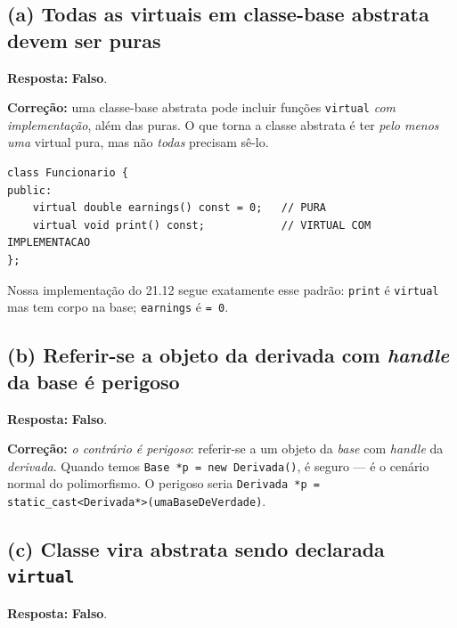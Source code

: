\documentclass[11pt,a4paper]{article}
\begin{document}
\subsection*{(a) Todas as virtuais em classe-base abstrata devem ser puras}

\begin{resposta}\textbf{Resposta:} \textbf{Falso}.\end{resposta}

\textbf{Corre\c{c}\~ao:} uma classe-base abstrata pode incluir fun\c{c}\~oes \texttt{virtual} \emph{com implementa\c{c}\~ao}, al\'em das puras. O que torna a classe abstrata \'e ter \emph{pelo menos uma} virtual pura, mas n\~ao \emph{todas} precisam s\^e-lo.

\begin{lstlisting}[style=cppcode,numbers=none]
class Funcionario {
public:
    virtual double earnings() const = 0;   // PURA
    virtual void print() const;            // VIRTUAL COM IMPLEMENTACAO
};
\end{lstlisting}

Nossa implementa\c{c}\~ao do 21.12 segue exatamente esse padr\~ao: \texttt{print} \'e \texttt{virtual} mas tem corpo na base; \texttt{earnings} \'e \texttt{= 0}.

\subsection*{(b) Referir-se a objeto da derivada com \emph{handle} da base \'e perigoso}

\begin{resposta}\textbf{Resposta:} \textbf{Falso}.\end{resposta}

\textbf{Corre\c{c}\~ao:} \emph{o contr\'ario \'e perigoso}: referir-se a um objeto da \emph{base} com \emph{handle} da \emph{derivada}. Quando temos \texttt{Base *p = new Derivada()}, \'e seguro --- \'e o cen\'ario normal do polimorfismo. O perigoso seria \texttt{Derivada *p = static\_cast<Derivada*>(umaBaseDeVerdade)}.

\subsection*{(c) Classe vira abstrata sendo declarada \texttt{virtual}}

\begin{resposta}\textbf{Resposta:} \textbf{Falso}.\end{resposta}
\end{document}

